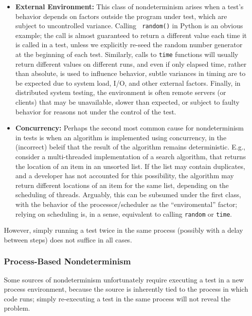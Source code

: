 \begin{itemize}
\item {\bf External Environment:} This class of nondeterminism arises
  when a test's behavior depends on factors outside the program under
  test, which are subject to uncontrolled variance.  Calling {\tt
    random()} in Python is an obvious example; the call is almost
  guaranteed to return a different value each time it is called in a
  test, unless we explicitly re-seed the random number generator at
  the beginning of each test.  Similarly, calls to {\tt time}
  functions  will usually return different values on different runs,
  and even if only elapsed time, rather than absolute, is used to
  influence behavior, subtle variances in timing are to be expected
  due to system load, I/O, and other external factors.  Finally, in
  distributed system testing, the environment is often remote servers
  (or clients) that may be unavailable, slower than expected, or
  subject to faulty behavior for reasons not under the control of the test.
\item {\bf Concurrency:} Perhaps the second most common cause for
  nondeterminism in tests is when an algorithm is implemented using
  concurrency, in the (incorrect) beleif that the result of the
  algorithm remains deterministic.  E.g., consider a multi-threaded
  implementation of a search algorithm, that returns the location of
  an item in an unsorted list.  If the list may contain duplicates,
  and a developer has not accounted for this possibility, the
  algorithm may return different locations of an item for the same list,
  depending on the scheduling of threads.  Arguably, this can be
  subsumed under the first class, with the behavior of the
  processor/scheduler as the ``enviromental'' factor; relying on
  scheduling is, in a sense, equivalent to calling {\tt random} or
  {\tt time}.
\end{itemize}

However, simply running a test twice in the same process (possibly with a delay between steps) does
not suffice in all cases.

\subsubsection{Process-Based Nondeterminism}

\label{sec:pnondet}

Some sources of nondeterminism unfortunately require executing a test in a new
process environment, because the source is inherently tied to the
process in which code runs; simply re-executing a test in the same
process will not reveal the problem.

